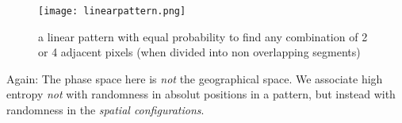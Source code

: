 \documentclass[fleqn,10pt]{wlscirep}
\begin{document}
\begin{figure}[h]
   \centering
   \texttt{[image: linearpattern.png]}
   \caption{a linear pattern with equal probability to find any combination of 2 or 4 adjacent pixels (when divided into non overlapping segments)}
   \label{fig:linearpattern}
\end{figure}
Again: The phase space here is \emph{not} the geographical space. We associate high entropy \emph{not} with randomness in absolut positions in a pattern, but instead  with randomness in the \emph{spatial configurations}. 











\end{document}
